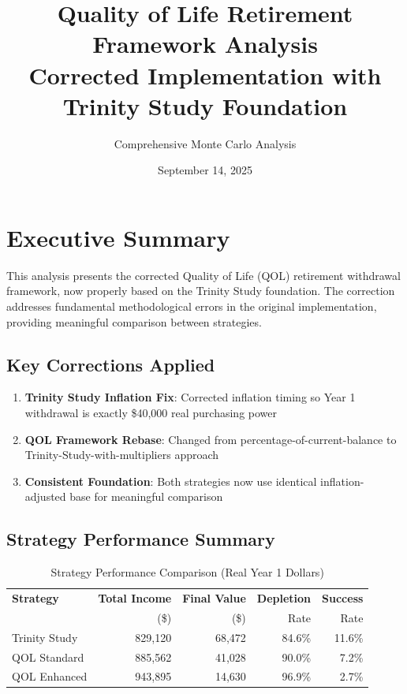 \documentclass[11pt,letterpaper]{article}
\title{\textcolor{primaryblue}{Quality of Life Retirement Framework Analysis} \\ 
        \large Corrected Implementation with Trinity Study Foundation}
\author{Comprehensive Monte Carlo Analysis}
\date{September 14, 2025}
\begin{document}
\maketitle

\section{Executive Summary}

This analysis presents the corrected Quality of Life (QOL) retirement withdrawal framework, now properly based on the Trinity Study foundation. The correction addresses fundamental methodological errors in the original implementation, providing meaningful comparison between strategies.

\subsection{Key Corrections Applied}

\begin{enumerate}
    \item \textbf{Trinity Study Inflation Fix}: Corrected inflation timing so Year 1 withdrawal is exactly \$40,000 real purchasing power
    \item \textbf{QOL Framework Rebase}: Changed from percentage-of-current-balance to Trinity-Study-with-multipliers approach
    \item \textbf{Consistent Foundation}: Both strategies now use identical inflation-adjusted base for meaningful comparison
\end{enumerate}

\subsection{Strategy Performance Summary}

\begin{table}[H]
\centering
\caption{Strategy Performance Comparison (Real Year 1 Dollars)}
\begin{tabular}{lrrrr}
\toprule
\textbf{Strategy} & \textbf{Total Income} & \textbf{Final Value} & \textbf{Depletion} & \textbf{Success} \\
& (\$) & (\$) & Rate & Rate \\
\midrule
Trinity Study & 829,120 & 68,472 & 84.6\% & 11.6\% \\
QOL Standard & 885,562 & 41,028 & 90.0\% & 7.2\% \\
QOL Enhanced & 943,895 & 14,630 & 96.9\% & 2.7\% \\
\bottomrule
\end{tabular}
\end{table}
\end{document}

